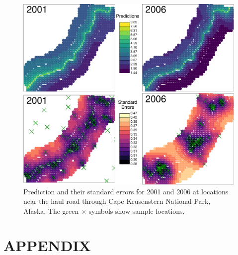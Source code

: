 \documentclass[12pt, titlepage]{article}
\begin{document}
\begin{figure}[H]
  \begin{center}
	    \includegraphics[width=.95\linewidth]{figures/moss_maps}
  \end{center}
  \caption{Prediction and their standard errors for 2001 and 2006 at locations near the haul road through Cape Krusenstern National Park, Alaska.  The green $\times$ symbols show sample locations. \label{Fig:moss_maps}}
\end{figure}




\clearpage
\setcounter{equation}{0}
\renewcommand{\theequation}{A.\arabic{equation}}
\setcounter{figure}{0}
\renewcommand{\thefigure}{A.\arabic{figure}}
\section{APPENDIX}

\end{document}

